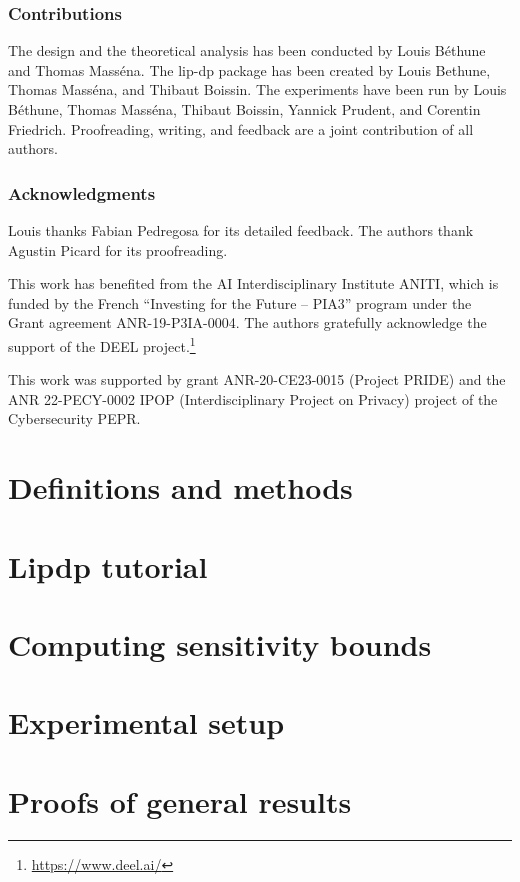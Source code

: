 \documentclass{article}
\begin{document}
\subsubsection*{Contributions}

The design and the theoretical analysis has been conducted by Louis Béthune and Thomas Masséna. The lip-dp package has been created by Louis Bethune, Thomas Masséna, and Thibaut Boissin. The experiments have been run by Louis Béthune, Thomas Masséna, Thibaut Boissin, Yannick Prudent, and Corentin Friedrich. Proofreading, writing, and feedback are a joint contribution of all authors.  

\subsubsection*{Acknowledgments}
Louis thanks Fabian Pedregosa for its detailed feedback. The authors thank Agustin Picard for its proofreading.
  
This work has benefited from the AI Interdisciplinary Institute ANITI, which is funded by the French ``Investing for the Future – PIA3'' program under the Grant agreement ANR-19-P3IA-0004. The authors gratefully acknowledge the support of the DEEL project.\footnote{\url{https://www.deel.ai/}} 
  
This work was supported by grant ANR-20-CE23-0015 (Project PRIDE) and the ANR 22-PECY-0002 IPOP (Interdisciplinary Project on Privacy) project of the Cybersecurity PEPR.  
\fi


\ifdefined\PAPER
\newpage
{
    
    
}
\fi



\ifdefined\APPENDIX
\newpage
\appendix

\tableofcontents
\newpage

\section{Definitions and methods}
    \label{app:method}

\section{Lipdp tutorial}\label{app:proofs}
    

\section{Computing sensitivity bounds}
    

\section{Experimental setup}\label{app:experiments}
    

\section{Proofs of general results}
    
\fi
\end{document}
